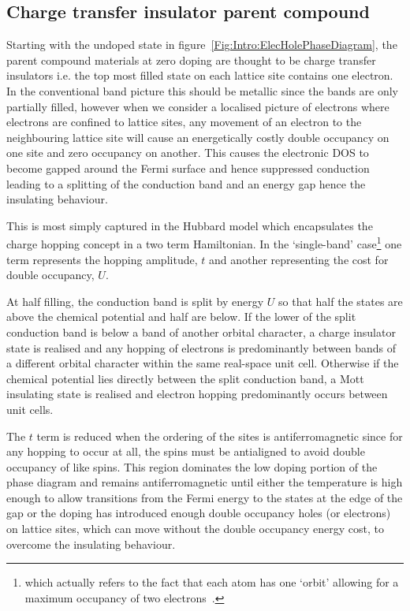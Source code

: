 \subsection{Charge transfer insulator parent compound}

Starting with the undoped state in figure~\ref{Fig:Intro:ElecHolePhaseDiagram}, the parent compound materials at zero doping are thought to be charge transfer insulators i.e. the top most filled state on each lattice site contains one electron. In the conventional band picture this should be metallic since the bands are only partially filled, however when we consider a localised picture of electrons where electrons are confined to lattice sites, any movement of an electron to the neighbouring lattice site will cause an energetically costly double occupancy on one site and zero occupancy on another. This causes the electronic \ac{DOS} to become gapped around the Fermi surface and hence suppressed conduction leading to a splitting of the conduction band and an energy gap hence the insulating behaviour. 

This is most simply captured in the Hubbard model which encapsulates the charge hopping concept in a two term Hamiltonian. In the `single-band' case\footnote{which actually refers to the fact that each atom has one `orbit' allowing for a maximum occupancy of two electrons~\cite{Tasaki1998}.} one term represents the hopping amplitude, $t$ and another representing the cost for double occupancy, $U$.  

At half filling, the conduction band is split by energy $U$ so that half the states are above the chemical potential and half are below. If the lower of the split conduction band is below a band of another orbital character, a charge insulator state is realised and any hopping of electrons is predominantly between bands of a different orbital character within the same real-space unit cell. Otherwise if the chemical potential lies directly between the split conduction band, a Mott insulating state is realised and electron hopping predominantly occurs between unit cells.

The $t$ term is reduced when the ordering of the sites is antiferromagnetic since for any hopping to occur at all, the spins must be antialigned to avoid double occupancy of like spins. This region dominates the low doping portion of the phase diagram and remains antiferromagnetic until either the temperature is high enough to allow transitions from the Fermi energy to the states at the edge of the gap or the doping has introduced enough double occupancy holes (or electrons) on lattice sites, which can move without the double occupancy energy cost, to overcome the insulating behaviour.

